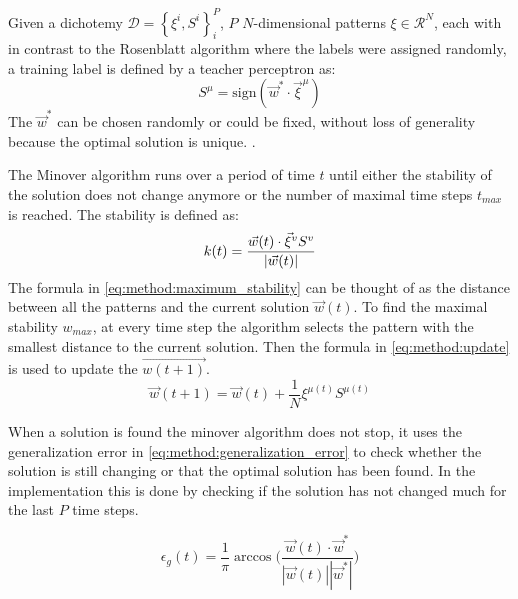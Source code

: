 Given a dichotemy $\mathcal{D} = \left\{\xi^i, S^i \right\}_{i}^{P}$, $P$ $N$-dimensional patterns $\xi \in \mathcal{R}^N$, each with in contrast to the Rosenblatt algorithm where the labels were assigned randomly, a training label is defined by a teacher perceptron as:
\begin{equation}\label{eq:method:teacher_label}
	S^\mu = \text{sign}(\vec{w}^* \cdot {\vec{\xi}}^{\mu})
\end{equation}
The $\vec{w}^*$ can be chosen randomly or could be fixed, without loss of generality because the optimal solution is unique. .

The Minover algorithm runs over a period of time $t$ until either the stability of the solution does not change anymore or the number of maximal time steps $t_{max}$ is reached. The  stability is defined as: 
\begin{equation}\label{eq:method:maximum_stability}
\mathnormal{k}(t) = \frac{\vec{w}(t) \cdot \vec{\xi}^v S^v}{|\vec{w}(t)|}
\end{equation} 
The formula in \eqref{eq:method:maximum_stability} can be thought of as the distance between all the patterns and the current solution $\vec{w}(t)$. To find the maximal stability $w_{max}$, at every time step the algorithm selects the pattern with the smallest distance to the current solution. Then the formula in \eqref{eq:method:update} is used to update the $\vec{w(t + 1)}$.
\begin{equation}\label{eq:method:update}
	\vec{w}(t + 1) = \vec{w}(t) + \frac{1}{N} \xi^{\mu(t)} S^{\mu(t)} 
\end{equation}

When a solution is found the minover algorithm does not stop, it uses the generalization error in \eqref{eq:method:generalization_error} to check whether the solution is still changing or that the optimal solution has been found. In the implementation this is done by checking if the solution has not changed much for the last $P$ time steps. 

\begin{equation}\label{eq:method:generalization_error}
	\epsilon_g(t) = \frac{1}{\pi} \arccos \bigg(\frac{\vec{w}(t) \cdot \vec{w}^*}{|\vec{w}(t)| |\vec{w}^*|}\bigg)
\end{equation}


